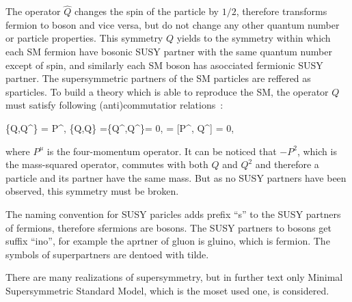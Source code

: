 The operator $\hat{Q}$ changes the spin of the particle by $1/2$, therefore transforms fermion to boson and vice versa, but do not change any other quantum number or particle properties. This symmetry $Q$ yields to the symmetry within which each SM fermion have bosonic SUSY partner with the same quantum number except of spin, and similarly each SM boson has asocciated fermionic SUSY partner. The supersymmetric partners of the SM particles are reffered as sparticles. To build a theory which is able to reproduce the SM, the operator $Q$ must satisfy following (anti)commutatior relations~\cite{Haag:1974qh, Coleman:1967ad}:

{
\{Q,Q^{\dagger}\} = P^{\mu}, \; \{Q,Q\} =\{Q^{\dagger},Q^{\dagger}\}= 0, \; [P^{\mu}, Q] = [P^{\mu}, Q^{\dagger}] = 0,
}

where $P^{\mu}$ is the four-momentum operator. It can be noticed that $-P^{2}$, which is the mass-squared operator, commutes with both $Q$ and $Q^{2}$ and therefore a particle and its partner have the same mass. But as no SUSY partners have been observed, this symmetry must be broken. 

The naming convention for SUSY paricles adds prefix ``s'' to the SUSY partners of fermions, therefore sfermions are bosons. The SUSY partners to bosons get suffix ``ino'', for example the aprtner of gluon is gluino, which is fermion. The symbols of superpartners are dentoed with tilde.

There are many realizations of supersymmetry, but in further text only Minimal Supersymmetric Standard Model, which is the moset used one, is considered.


